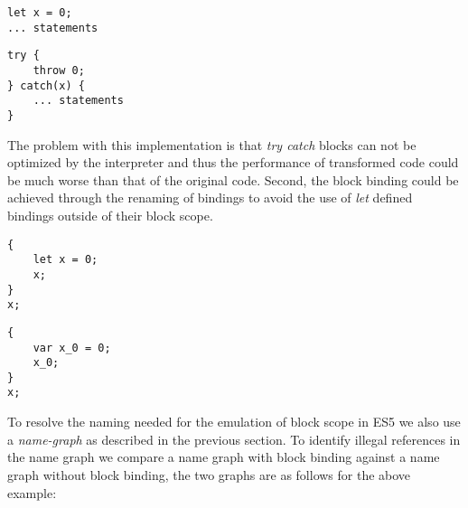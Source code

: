 \begin{minipage}{0.45\linewidth}
\begin{lstlisting}
let x = 0;
... statements
\end{lstlisting}
\end{minipage}
\hfill
\begin{minipage}{0.45\linewidth}
\begin{lstlisting}
try {
	throw 0;
} catch(x) {
	... statements
}
\end{lstlisting}
\end{minipage}

The problem with this implementation is that \textit{try catch} blocks can not be optimized by the interpreter and thus the performance of transformed code could be much worse than that of the original code. Second, the block binding could be achieved through the renaming of bindings to avoid the use of \textit{let} defined bindings outside of their block scope.

\begin{minipage}{0.45\linewidth}
\begin{lstlisting}
{
	let x = 0;
	x;
}
x;
\end{lstlisting}
\end{minipage}
\hfill
\begin{minipage}{0.45\linewidth}
\begin{lstlisting}
{
	var x_0 = 0;
	x_0;
}
x;
\end{lstlisting}
\end{minipage}

To resolve the naming needed for the emulation of block scope in ES5 we also use a \textit{name-graph} as described in the previous section. To identify illegal references in the name graph we compare a name graph with block binding against a name graph without block binding, the two graphs are as follows for the above example:

